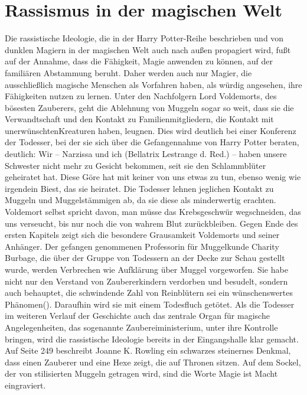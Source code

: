 \section{Rassismus in der magischen Welt}
Die rassistische Ideologie, die in der \glqq Harry Potter\grqq-Reihe beschrieben und von dunklen Magiern in der magischen Welt auch nach außen propagiert wird, fußt auf der Annahme, dass die Fähigkeit, Magie anwenden zu können, auf der familiären Abstammung beruht.
Daher werden auch nur Magier, die ausschließlich magische Menschen als Vorfahren haben, als würdig angesehen, ihre Fähigkeiten nutzen zu lernen.
Unter den Nachfolgern Lord Voldemorts, des bösesten Zauberers, geht die Ablehnung von Muggeln sogar so weit, dass sie die Verwandtschaft und den Kontakt zu Familienmitgliedern, die Kontakt mit \glqq unerwünschten\grqq Kreaturen haben, leugnen.
Dies wird deutlich bei einer Konferenz der Todesser, bei der sie sich über die Gefangennahme von Harry Potter beraten, deutlich: \glqq Wir – Narzissa und ich (Bellatrix Lestrange d. Red.) – haben unsere Schwester nicht mehr zu Gesicht bekommen, seit sie den Schlammblüter geheiratet hat. Diese Göre hat mit keiner von uns etwas zu tun, ebenso wenig wie irgendein Biest, das sie heiratet.\cite[S.18]{JKR10}\grqq{}
Die Todesser lehnen jeglichen Kontakt zu Muggeln und Muggelstämmigen ab, da sie diese als minderwertig erachten.
Voldemort selbst spricht davon, man müsse \glqq das Krebsgeschwür wegschneiden, das uns verseucht, bis nur noch die von wahrem Blut zurückbleiben.\cite[S.19]{JKR10}\grqq{} 
Gegen Ende des ersten Kapitels zeigt sich die besondere Grausamkeit Voldemorts und seiner Anhänger. 
Der gefangen genommenen Professorin für \glqq Muggelkunde\grqq{} Charity Burbage, die über der Gruppe von Todessern an der Decke zur Schau gestellt wurde, werden \glqq Verbrechen\grqq{} wie Aufklärung über Muggel vorgeworfen. 
Sie habe nicht nur \glqq den Verstand von Zaubererkindern\grqq{} verdorben und besudelt, sondern auch behauptet, die schwindende Zahl von Reinblütern sei ein \glqq wünschenswertes Phänomen\grqq (\cite[S.19]{JKR10}). 
Daraufhin wird sie mit einem Todesfluch getötet.
Als die Todesser im weiteren Verlauf der Geschichte auch das zentrale Organ für magische Angelegenheiten, das sogenannte Zaubereiministerium, unter ihre Kontrolle bringen, wird die rassistische Ideologie bereits in der Eingangshalle klar gemacht.
Auf Seite 249 beschreibt Joanne K. Rowling ein schwarzes steinernes Denkmal, dass einen Zauberer und eine Hexe zeigt, die auf Thronen sitzen.\cite[S.249]{JKR10} 
Auf dem Sockel, der von stilisierten Muggeln getragen wird, sind die Worte \glqq Magie ist Macht\grqq{} eingraviert. 
